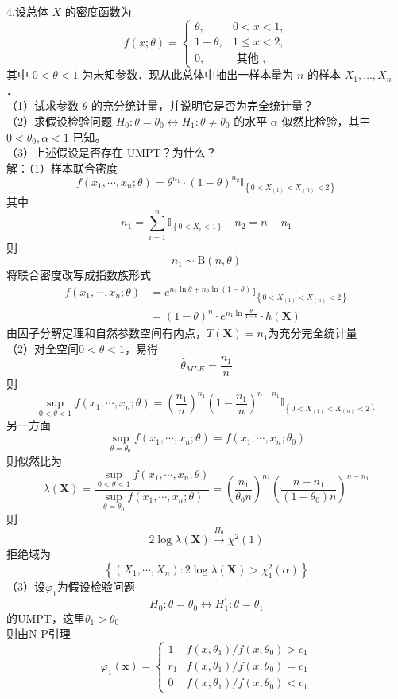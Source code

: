 \documentclass[UTF8]{ctexart}
\begin{document}
\noindent 4.设总体 $X$ 的密度函数为
$$
f(x ; \theta)= \begin{cases}\theta, & 0<x<1, \\ 1-\theta, & 1 \leq x<2, \\ 0, & \text { 其他 },\end{cases}
$$
其中 $0<\theta<1$ 为未知参数．现从此总体中抽出一样本量为 $n$ 的样本 $X_1, \ldots, X_n$ ．\\
（1）试求参数 $\theta$ 的充分统计量，并说明它是否为完全统计量？\\
（2）求假设检验问题 $H_0: \theta=\theta_0 \leftrightarrow H_1: \theta \neq \theta_0$ 的水平 $\alpha$ 似然比检验，其中 $0<\theta_0, \alpha<1$ 已知。\\
（3）上述假设是否存在 UMPT？为什么？\\
解：（1）样本联合密度
\[
f(x_1,\cdots,x_n;\theta)=\theta^{n_1}\cdot (1-\theta)^{n_2}\mathbb{I}_{\left\{0<X_{(1)}<X_{(n)}<2\right\}}
\]
其中
\[
n_1=\sum_{i=1}^{n} \mathbb{I}_{\left\{0<X_i<1 \right\}}\quad n_2=n-n_1
\]
则
\[
n_1\sim \mathrm{B}(n,\theta)
\]
将联合密度改写成指数族形式
\begin{align*}
	f(x_1,\cdots,x_n;\theta)&=e^{n_1\ln \theta +n_2\ln (1-\theta)}\mathbb{I}_{\left\{0<X_{(1)}<X_{(n)}<2\right\}}  \\
	& =(1-\theta)^n \cdot e^{n_1\ln \frac{\theta}{1-\theta}}\cdot h(\boldsymbol{X})
\end{align*}
由因子分解定理和自然参数空间有内点，$T(\boldsymbol{X})=n_1$为充分完全统计量\\
（2）对全空间$0<\theta<1$，易得
\[
\hat{\theta}_{MLE}=\frac{n_1}{n}
\]
则
\[
\sup\limits_{0<\theta<1} f(x_1,\cdots,x_n;\theta) = \left(\frac{n_1}{n}\right)^{n_1}\left(1-\frac{n_1}{n}\right)^{n-n_1}\mathbb{I}_{\left\{0<X_{(1)}<X_{(n)}<2\right\}}
\]
另一方面
\[
\sup\limits_{\theta=\theta_0} f(x_1,\cdots,x_n;\theta)=f(x_1,\cdots,x_n;\theta_0)
\]
则似然比为
\[
\lambda(\boldsymbol{X})=\frac{\sup\limits_{0<\theta<1} f(x_1,\cdots,x_n;\theta)}{\sup\limits_{\theta=\theta_0} f(x_1,\cdots,x_n;\theta)}=\left(\frac{n_1}{\theta_0 n}\right)^{n_1}\left(\frac{n-n_1}{\left(1-\theta_0\right) n}\right)^{n-n_1}
\]
则
\[
2\log \lambda(\boldsymbol{X})\xrightarrow{H_0}\chi^2(1)
\]
拒绝域为
\[
\left\{(X_1,\cdots,X_n):2\log \lambda(\boldsymbol{X})>\chi^2_1(\alpha) \right\}
\]
（3）设$\varphi_1$为假设检验问题
\[
H_0:\theta=\theta_0 \leftrightarrow H_1^{\prime}:\theta=\theta_1
\]
的UMPT，这里$\theta_1>\theta_0$\\
则由N-P引理
\[
\varphi_1(\boldsymbol{x})= 
\begin{cases}
	1 & f\left(x, \theta_1\right) / f\left(x, \theta_0\right)>c_1 \\ 
	r_1 & f\left( x, \theta_1 \right) /f\left(x, \theta_0\right)=c_1 \\ 
	0 & f\left(x, \theta_1\right) / f\left(x, \theta_0\right) <c_1
\end{cases}
\]
\end{document}
